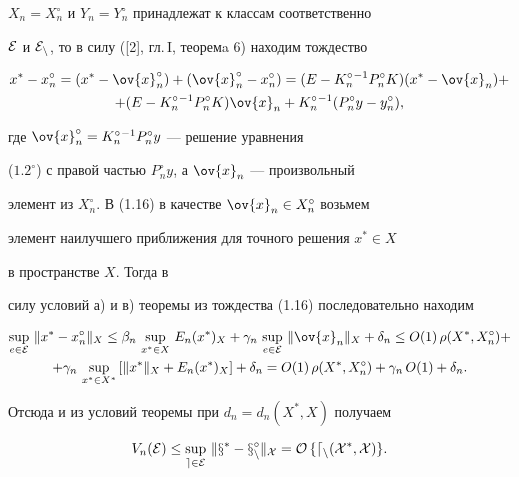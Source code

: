 $X_n=X_n^\circ $ и $Y_n=Y_n^\circ $ принадлежат к классам соответственно


$\cal E$ и $\cal E_n$, то в силу ([2], гл.\,I, теоремa 6) находим тождество


\begin{multline}


x^*-x_n^\circ =(x^*-\ov{x}_n^\circ )+(\ov{x}_n^\circ -x_n^\circ )=


(E-K_n^\circ {}^{-1}P_n^\circ K)(x^*-\ov{x}_n)+ \\


%


+(E-K_n^\circ {}^{-1}P_n^\circ K)\ov{x}_n +K_n^\circ {}^{-1}


(P_n^\circ y-y_n^\circ ),


\end{multline}


где $\ov{x}_n^\circ =K_n^\circ {}^{-1}P_n^\circ y$ --- решение уравнения


($1.2^\circ $) с правой частью $P_n^\circ y$, а $\ov{x}_n$ --- произвольный


элемент из $X_n^\circ$. В (1.16) в качестве $\ov{x}_n\in X_n^\circ $ возьмем


элемент наилучшего приближения для точного решения $x^*\in X$


в пространстве $X$. Тогда в


силу условий а) и в) теоремы из тождества (1.16) последовательно находим


\begin{multline*}


\sup_{e\in \cal E}\, \|x^*-x_n^\circ\|_X \leq


\beta_n\, \sup_{x^*\in X}\, E_n(x^*)_X +


\gamma_n\, \sup_{e\in \cal E}\, \|\ov{x}_n\|_X +\delta_n\leq


O(1)\, \rho(X^*,X_n^\circ)+ \\


%


+\gamma_n\, \sup_{x^*\in X^*}\, [ \|x^*\|_X +


E_n(x^*)_X] +\delta_n=


O(1)\, \rho(X^*,X_n^\circ) +\gamma_n\, O(1) +\delta_n .


\end{multline*}


Отсюда и из условий теоремы при $d_n=d_n(X^*,X)$ получаем


\begin{equation}


V_n(\cal E)\leq \sup_{e\in \cal E}\, \|x^*-x_n^\circ\|_X =


O\, \{d_n(X^*,X)\} .


\end{equation}


